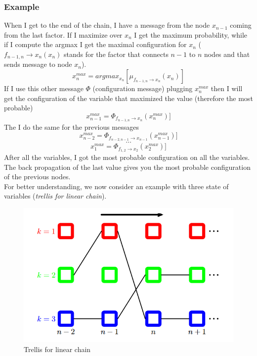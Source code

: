         \subsubsection{Example}    
            When I get to the end of the chain, I have a message from the node $x_{n-1}$ coming from the last factor. If I maximize over $x_n$ I get the maximum probability, while if I compute the argmax I get the maximal configuration for $x_n$ (${f_{n-1, n}\rightarrow x_n}(x_n)$ stands for the factor that connects $n-1$ to $n$ nodes and that sends message to node $x_n$). 
            $$x_n ^{max} = argmax _{x_n} [\mu_{f_{n-1, n} \rightarrow x_n}(x_n)]$$
            If I use this other message $\Phi$ (configuration message) plugging $x_n ^{max}$ then I will get the configuration of the variable that maximized the value (therefore the most probable) 
            $$x_{n-1} ^{max} = \Phi_{f_{n-1, n} \rightarrow x_n}(x_n^{max})]$$
            The I do the same for the previous messages
            $$x_{n-2} ^{max} = \Phi_{f_{n-2, n-1} \rightarrow x_{n-1}}(x_{n-1}^{max})]$$
            $$\dots$$
            $$x_{1} ^{max} = \Phi_{f_{1, 2} \rightarrow x_2}(x_2^{max})]$$
            After all the variables, I got the most probable configuration on all the variables. The back propagation of the last value gives you the most probable configuration of the previous nodes.\\
            For better understanding, we now consider an example with three state of variables (\textit{trellis for linear chain}).
            \begin{figure}[ht]
                \centering
                \includegraphics[scale=0.3]{images/recovering maximal configuration.png}
                \caption{Trellis for linear chain}
                \label{fig:trellis}
            \end{figure}
